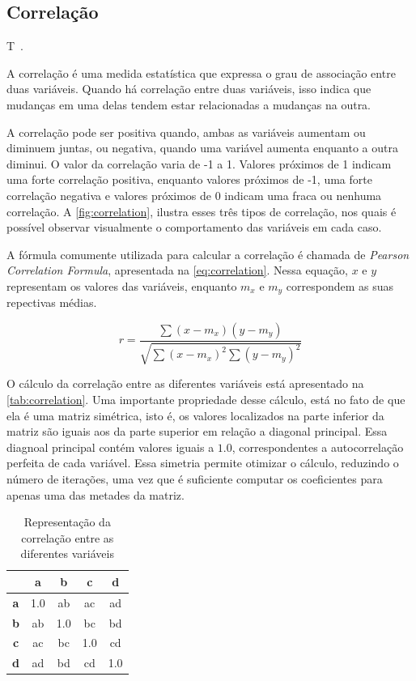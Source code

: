 \subsection{Correlação}\label{subsec:correlation}

T~\cite{morettin2010}.

A correlação é uma medida estatística que expressa o grau de associação entre duas variáveis. Quando há correlação entre duas variáveis, isso indica que mudanças em uma delas tendem estar relacionadas a mudanças na outra.

A correlação pode ser positiva quando, ambas as variáveis aumentam ou diminuem juntas, ou negativa, quando uma variável aumenta enquanto a outra diminui. O valor da correlação varia de -1 a 1. Valores próximos de 1 indicam uma forte correlação positiva, enquanto valores próximos de -1, uma forte correlação negativa e valores próximos de 0 indicam uma fraca ou nenhuma correlação. A \autoref{fig:correlation}, ilustra esses três tipos de correlação, nos quais é possível observar visualmente o comportamento das variáveis em cada caso.

A fórmula comumente utilizada para calcular a correlação é chamada de \textit{Pearson Correlation Formula}, apresentada na \autoref{eq:correlation}. Nessa equação, $x$ e $y$ representam os valores das variáveis, enquanto $m_x$ e $m_y$ correspondem as suas repectivas médias.

\begin{equation}
	\label{eq:correlation}
	r = \frac{\sum(x - m_x)(y - m_y)}{\sqrt{\sum(x-m_x)^2 \sum(y - m_y)^2}}
\end{equation}

O cálculo da correlação entre as diferentes variáveis está apresentado na \autoref{tab:correlation}. Uma importante propriedade desse cálculo, está no fato de que ela é uma matriz simétrica, isto é, os valores localizados na parte inferior da matriz são iguais aos da parte superior em relação a diagonal principal. Essa diagnoal principal contém valores iguais a $1.0$, correspondentes a autocorrelação perfeita de cada variável. Essa simetria permite otimizar o cálculo, reduzindo o número de iterações, uma vez que é suficiente computar os coeficientes para apenas uma das metades da matriz.

\begin{table}[htb]
	\centering
	\begin{tabular}{|c|c|c|c|c|}
		\hline
		           & \textbf{a} & \textbf{b} & \textbf{c} & \textbf{d} \\
		\hline
		\textbf{a} & 1.0        & ab         & ac         & ad         \\
		\hline
		\textbf{b} & ab         & 1.0        & bc         & bd         \\
		\hline
		\textbf{c} & ac         & bc         & 1.0        & cd         \\
		\hline
		\textbf{d} & ad         & bd         & cd         & 1.0        \\
		\hline
	\end{tabular}
	\caption{Representação da correlação entre as diferentes variáveis}
	\fonte{}
	\label{tab:correlation}
\end{table}

